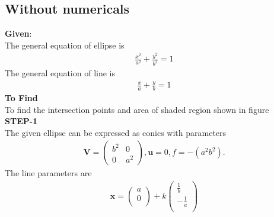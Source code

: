 \documentclass[10pt,a4paper]{report}
\newcommand{\myvec}[1]{\ensuremath{\begin{pmatrix}#1\end{pmatrix}}}
\let\vec\mathbf
\let\vec\mathbf
\begin{document}
\begin{multicols}{2}
\section{Without numericals}
\raggedright \textbf{Given}:\vspace{2mm}\\
The general equation of ellipse is \\\vspace{1mm}
\begin{align}
\frac{x^2}{a^2}+\frac{y^2}{b^2}=1
\end{align}
The general equation of line is \\ \vspace{1mm}
\begin{align}
\frac{x}{a}+\frac{y}{b}=1
\end{align}
\textbf{To Find }\vspace{2mm}\\
To find the intersection points and area of shaded region shown in figure\vspace{2mm}  \\ 
\textbf{STEP-1}\vspace{2mm}\\
\fi
The given ellipse can be expressed as conics with parameters
\begin{align}
\vec{V}=\myvec{
b^2 & 0\\
0 & a^2
},
\vec{u}=0,
f=-(a^2b^2).
\end{align} 
The line parameters are
\iffalse
\begin{align} 
	\vec{x}=\begin{pmatrix}a \\ 0 \\ \end{pmatrix}+k\begin{pmatrix}\frac{1}{b} \\ -\frac{1}{a} \\ \end{pmatrix}
\end{align}


\end{multicols}
\end{document}
